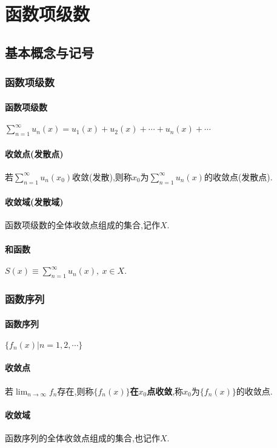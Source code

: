 \documentclass[UTF8]{ctexart}
\begin{document}
\section{函数项级数}
\subsection{基本概念与记号}
\subsubsection{函数项级数}

\paragraph{函数项级数}$\sum_{n=1}^\infty u_n(x)=u_1(x)+u_2(x)+\cdots+u_n(x)+\cdots$

\paragraph{收敛点(发散点)}若$\sum_{n=1}^\infty u_n(x_0)$收敛(发散),则称$x_0$为$\sum_{n=1}^\infty u_n(x)$的收敛点(发散点).

\paragraph{收敛域(发散域)}函数项级数的全体收敛点组成的集合,记作$X$.

\paragraph{和函数}$S(x)\equiv\sum_{n=1}^\infty u_n(x),\ x\in X.$

\subsubsection{函数序列}

\paragraph{函数序列}$\{f_n(x)|n=1,2,\cdots\}$

\paragraph{收敛点}若$\lim_{n\rightarrow\infty}f_n$存在,则称$\{f_n(x)\}$\textbf{在$x_0$点收敛},称$x_0$为$\{f_n(x)\}$的收敛点.

\paragraph{收敛域}函数序列的全体收敛点组成的集合,也记作$X$.
\end{document}
